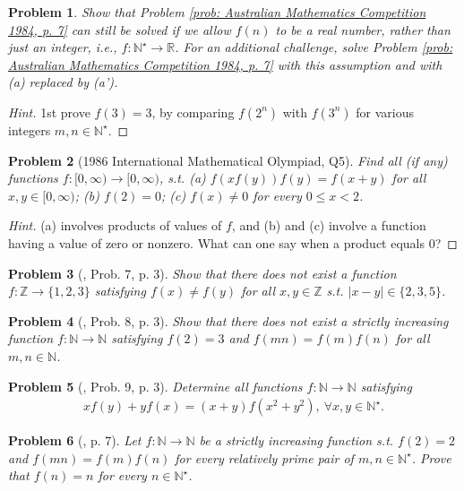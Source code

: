 \documentclass[oneside]{book}
\numberwithin{equation}{section}
\newtheorem{problem}{Problem}[section]
\begin{document}
\begin{problem}
	Show that Problem \ref{prob: Australian Mathematics Competition 1984, p. 7} can still be solved if we allow $f(n)$ to be a real number, rather than just an integer, i.e., $f:\mathbb{N}^\star\to\mathbb{R}$. For an additional challenge, solve Problem \ref{prob: Australian Mathematics Competition 1984, p. 7} with this assumption and with (a) replaced by (a').
\end{problem}

\begin{proof}[Hint]
	1st prove $f(3) = 3$, by comparing $f(2^n)$ with $f(3^n)$ for various integers $m,n\in\mathbb{N}^\star$.
\end{proof}

\begin{problem}[1986 International Mathematical Olympiad, Q5]
	Find all (if any) functions $f:[0,\infty)\to[0,\infty)$, s.t. (a) $f(xf(y))f(y) = f(x + y)$ for all $x,y\in[0,\infty)$; (b) $f(2) = 0$; (c) $f(x)\ne 0$ for every $0\le x < 2$.
\end{problem}

\begin{proof}[Hint]
	(a) involves products of values of $f$, and (b) and (c) involve a function having a value of zero or nonzero. What can one say when a product equals 0?
\end{proof}

\begin{problem}[\cite{Gelca_Andreescu2017}, Prob. 7, p. 3]
	Show that there does not exist a function $f:\mathbb{Z}\to\{1,2,3\}$ satisfying $f(x)\ne f(y)$ for all $x,y\in\mathbb{Z}$ s.t. $|x - y|\in\{2,3,5\}$.
\end{problem}

\begin{problem}[\cite{Gelca_Andreescu2017}, Prob. 8, p. 3]
	Show that there does not exist a strictly increasing function $f:\mathbb{N}\to\mathbb{N}$ satisfying $f(2) = 3$ and $f(mn) = f(m)f(n)$ for all $m,n\in\mathbb{N}$.
\end{problem}

\begin{problem}[\cite{Gelca_Andreescu2017}, Prob. 9, p. 3]
	Determine all functions $f:\mathbb{N}\to\mathbb{N}$ satisfying
	\begin{align*}
		xf(y) + yf(x) = (x + y)f(x^2 + y^2),\ \forall x,y\in\mathbb{N}^\star.
	\end{align*}
\end{problem}

\begin{problem}[\cite{Gelca_Andreescu2017}, p. 7]
	Let $f:\mathbb{N}\to\mathbb{N}$ be a strictly increasing function s.t. $f(2) = 2$ and $f(mn) = f(m)f(n)$ for every relatively prime pair of $m,n\in\mathbb{N}^\star$. Prove that $f(n) = n$ for every $n\in\mathbb{N}^\star$.
\end{problem}
\end{document}

